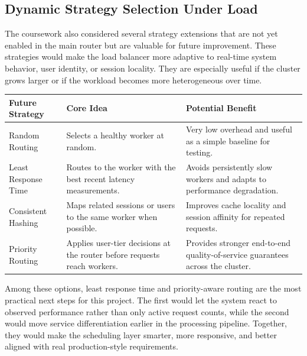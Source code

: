 \subsection{Dynamic Strategy Selection Under Load}
The coursework also considered several strategy extensions that are not yet enabled in the main router but are valuable for future improvement. These strategies would make the load balancer more adaptive to real-time system behavior, user identity, or session locality. They are especially useful if the cluster grows larger or if the workload becomes more heterogeneous over time.

\begin{table}[H]
  \centering
  \renewcommand{\arraystretch}{1.2}
  \begin{tabularx}{\textwidth}{@{}l X X@{}}
    \toprule
    \textbf{Future Strategy} & \textbf{Core Idea} & \textbf{Potential Benefit} \\
    \midrule
    Random Routing & Selects a healthy worker at random. & Very low overhead and useful as a simple baseline for testing. \\
    Least Response Time & Routes to the worker with the best recent latency measurements. & Avoids persistently slow workers and adapts to performance degradation. \\
    Consistent Hashing & Maps related sessions or users to the same worker when possible. & Improves cache locality and session affinity for repeated requests. \\
    Priority Routing & Applies user-tier decisions at the router before requests reach workers. & Provides stronger end-to-end quality-of-service guarantees across the cluster. \\
    \bottomrule
  \end{tabularx}
\end{table}

Among these options, least response time and priority-aware routing are the most practical next steps for this project. The first would let the system react to observed performance rather than only active request counts, while the second would move service differentiation earlier in the processing pipeline. Together, they would make the scheduling layer smarter, more responsive, and better aligned with real production-style requirements.
